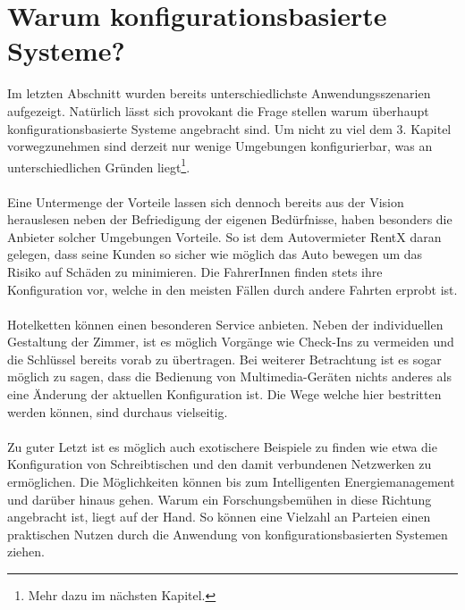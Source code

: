\section{Warum konfigurationsbasierte Systeme?}
Im letzten Abschnitt wurden bereits unterschiedlichste Anwendungsszenarien aufgezeigt. Natürlich lässt sich provokant die Frage stellen warum überhaupt konfigurationsbasierte
Systeme angebracht sind. Um nicht zu viel dem 3. Kapitel vorwegzunehmen sind derzeit nur wenige Umgebungen konfigurierbar, was an unterschiedlichen Gründen 
liegt\footnote{Mehr dazu im nächsten Kapitel.}.
\\\\
Eine Untermenge der Vorteile lassen sich dennoch bereits aus der Vision herauslesen neben der Befriedigung der eigenen Bedürfnisse, haben besonders die Anbieter solcher 
Umgebungen Vorteile. So ist dem Autovermieter RentX daran gelegen, dass seine Kunden so sicher wie möglich das Auto bewegen um das Risiko auf Schäden zu minimieren. Die 
FahrerInnen finden stets ihre Konfiguration vor, welche in den meisten Fällen durch andere Fahrten erprobt ist.
\\\\
Hotelketten können einen besonderen Service anbieten. Neben der individuellen Gestaltung der Zimmer, ist es möglich Vorgänge wie Check-Ins zu vermeiden und die Schlüssel 
bereits vorab zu übertragen. Bei weiterer Betrachtung ist es sogar möglich zu sagen, dass die Bedienung von Multimedia-Geräten nichts anderes als eine Änderung der aktuellen
Konfiguration ist. Die Wege welche hier bestritten werden können, sind durchaus vielseitig. 
\\\\
Zu guter Letzt ist es möglich auch exotischere Beispiele zu finden wie etwa die Konfiguration von Schreibtischen und den damit verbundenen Netzwerken zu ermöglichen. 
Die Möglichkeiten können bis zum Intelligenten Energiemanagement und darüber hinaus gehen.
Warum ein Forschungsbemühen in diese Richtung angebracht ist, liegt auf der Hand. So können eine Vielzahl an Parteien einen praktischen Nutzen durch die Anwendung von 
konfigurationsbasierten Systemen ziehen.

